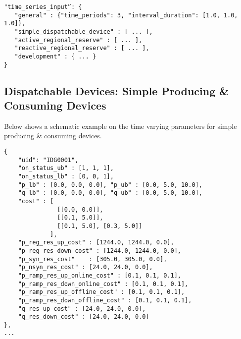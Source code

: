 \begin{verbatim}
"time_series_input”: {
   "general" : {"time_periods": 3, "interval_duration": [1.0, 1.0, 1.0]},
   "simple_dispatchable_device" : [ ... ],
   "active_regional_reserve" : [ ... ],
   "reactive_regional_reserve" : [ ... ],
   "development" : { ... }
}
\end{verbatim}



\subsection{Dispatchable Devices: Simple Producing \& Consuming Devices}
\label{sec:generator_time}
Below shows a schematic example on the time varying parameters for simple producing \& consuming devices.
\begin{verbatim}
{
    "uid": "IDG0001",
    "on_status_ub" : [1, 1, 1],
    "on_status_lb" : [0, 0, 1],
    "p_lb" : [0.0, 0.0, 0.0], "p_ub" : [0.0, 5.0, 10.0],
    "q_lb" : [0.0, 0.0, 0.0], "q_ub" : [0.0, 5.0, 10.0],
    "cost" : [
               [[0.0, 0.0]],
               [[0.1, 5.0]],
               [[0.1, 5.0], [0.3, 5.0]]
             ],
    "p_reg_res_up_cost" : [1244.0, 1244.0, 0.0], 
    "p_reg_res_down_cost" : [1244.0, 1244.0, 0.0],
    "p_syn_res_cost"    : [305.0, 305.0, 0.0], 
    "p_nsyn_res_cost" : [24.0, 24.0, 0.0], 
    "p_ramp_res_up_online_cost" : [0.1, 0.1, 0.1], 
    "p_ramp_res_down_online_cost" : [0.1, 0.1, 0.1],
    "p_ramp_res_up_offline_cost" : [0.1, 0.1, 0.1], 
    "p_ramp_res_down_offline_cost" : [0.1, 0.1, 0.1],
    "q_res_up_cost" : [24.0, 24.0, 0.0], 
    "q_res_down_cost" : [24.0, 24.0, 0.0]
},
...
\end{verbatim}

